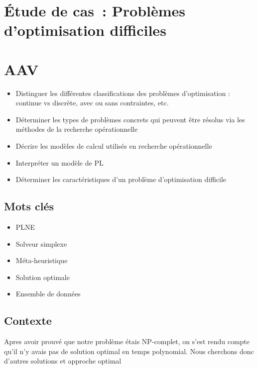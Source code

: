 \newpage
\section*{Étude de cas~: Problèmes d'optimisation difficiles}

\section*{AAV}
\begin{itemize}
	\item [4] Distinguer les différentes classifications des problèmes d’optimisation : continue vs discrète, avec ou sans contraintes, etc.
	\item [3] Déterminer les types de problèmes concrets qui peuvent être résolus via les méthodes de la recherche opérationnelle
	\item [3] Décrire les modèles de calcul utilisés en recherche opérationnelle
	\item [3] Interpréter un modèle de PL
	\item [3] Déterminer les caractéristiques d'un problème d'optimisation difficile
\end{itemize}

\newpage

\subsection*{Mots clés}
{}
\begin{itemize}
	\item PLNE
	\item Solveur simplexe
	\item Méta-heuristique
	\item Solution optimale
	\item Ensemble de données
\end{itemize}

\subsection*{Contexte}
{}
\noindent Apres avoir prouvé que notre problème étais NP-complet, on s’est rendu compte qu’il n’y avais pas de solution optimal en temps polynomial. Nous cherchons donc d’autres solutions et approche optimal



